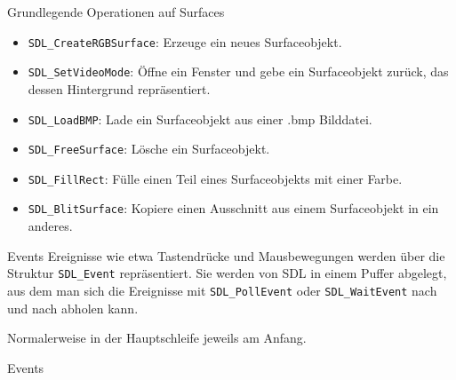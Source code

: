 \begin{frame}[fragile]{Grundlegende Operationen auf Surfaces}
	\begin{itemize}
		\item \verb|SDL_CreateRGBSurface|: Erzeuge ein neues Surfaceobjekt.
		\item \verb|SDL_SetVideoMode|: Öffne ein Fenster und gebe ein Surfaceobjekt zurück, das dessen Hintergrund repräsentiert.
		\item \verb|SDL_LoadBMP|: Lade ein Surfaceobjekt aus einer .bmp Bilddatei.
		\item \verb|SDL_FreeSurface|: Lösche ein Surfaceobjekt.
		\item \verb|SDL_FillRect|: Fülle einen Teil eines Surfaceobjekts mit einer Farbe.
		\item \verb|SDL_BlitSurface|: Kopiere einen Ausschnitt aus einem Surfaceobjekt in ein anderes.
	\end{itemize}
\end{frame}

\begin{frame}[fragile]{Events}
	Ereignisse wie etwa Tastendrücke und Mausbewegungen werden über die Struktur \verb|SDL_Event| repräsentiert.
	Sie werden von SDL in einem Puffer abgelegt, aus dem man sich die Ereignisse mit \verb|SDL_PollEvent| oder 
	\verb|SDL_WaitEvent| nach und nach abholen kann.
	
	Normalerweise in der Hauptschleife jeweils am Anfang.
\end{frame}

\begin{frame}[fragile]{Events}
	
\end{frame}
